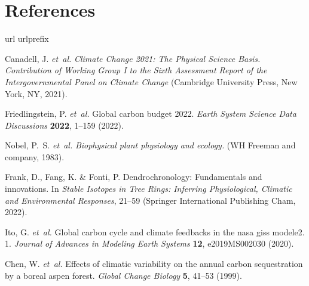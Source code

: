 \documentclass[11pt]{article}
\begin{document}
\clearpage
\section{References}
\begin{thebibliography}{100}
\expandafter\ifx\csname url\endcsname\relax
  \def\url#1{\texttt{#1}}\fi
\expandafter\ifx\csname urlprefix\endcsname\relax\def\urlprefix{URL }\fi
\providecommand{\bibinfo}[2]{#2}
\providecommand{\eprint}[2][]{\url{#2}}

\bibinfo{author}{Canadell, J.} \emph{et~al.}
\newblock \emph{\bibinfo{title}{Climate Change 2021: The Physical Science
  Basis. Contribution of Working Group I to the Sixth Assessment Report of the
  Intergovernmental Panel on Climate Change}} (\bibinfo{publisher}{Cambridge
  University Press}, \bibinfo{address}{New York, NY}, \bibinfo{year}{2021}).

\bibinfo{author}{Friedlingstein, P.} \emph{et~al.}
\newblock \bibinfo{title}{Global carbon budget 2022}.
\newblock \emph{\bibinfo{journal}{Earth System Science Data Discussions}}
  \textbf{\bibinfo{volume}{2022}}, \bibinfo{pages}{1--159}
  (\bibinfo{year}{2022}).

\bibinfo{author}{Nobel, P.~S.} \emph{et~al.}
\newblock \emph{\bibinfo{title}{Biophysical plant physiology and ecology.}}
  (\bibinfo{publisher}{WH Freeman and company}, \bibinfo{year}{1983}).

\bibinfo{author}{Frank, D.}, \bibinfo{author}{Fang, K.} \&
  \bibinfo{author}{Fonti, P.}
\newblock \bibinfo{title}{Dendrochronology: Fundamentals and innovations}.
\newblock In \emph{\bibinfo{booktitle}{Stable Isotopes in Tree Rings: Inferring
  Physiological, Climatic and Environmental Responses}},
  \bibinfo{pages}{21--59} (\bibinfo{publisher}{Springer International
  Publishing Cham}, \bibinfo{year}{2022}).

\bibinfo{author}{Ito, G.} \emph{et~al.}
\newblock \bibinfo{title}{Global carbon cycle and climate feedbacks in the nasa
  giss modele2. 1}.
\newblock \emph{\bibinfo{journal}{Journal of Advances in Modeling Earth
  Systems}} \textbf{\bibinfo{volume}{12}}, \bibinfo{pages}{e2019MS002030}
  (\bibinfo{year}{2020}).

\bibinfo{author}{Chen, W.} \emph{et~al.}
\newblock \bibinfo{title}{Effects of climatic variability on the annual carbon
  sequestration by a boreal aspen forest}.
\newblock \emph{\bibinfo{journal}{Global Change Biology}}
  \textbf{\bibinfo{volume}{5}}, \bibinfo{pages}{41--53} (\bibinfo{year}{1999}).


\end{thebibliography}
\end{document}
